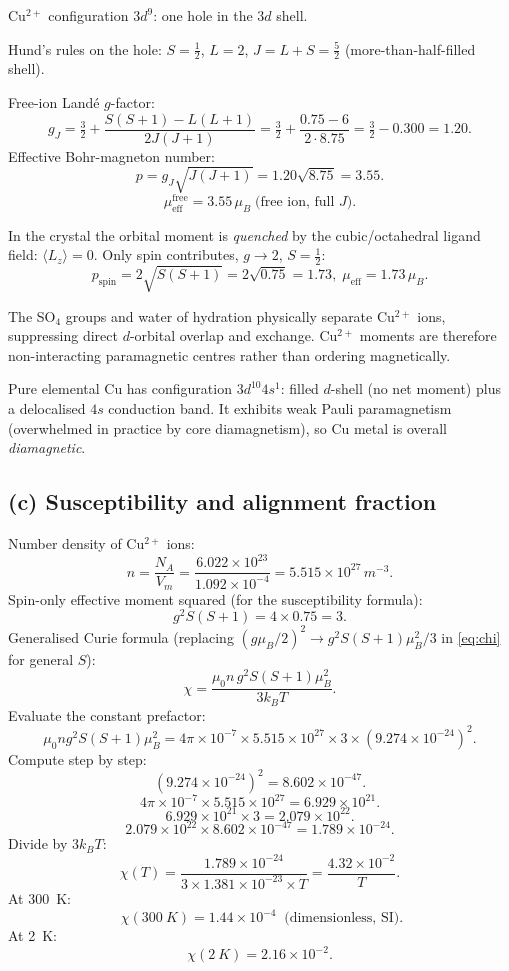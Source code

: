 \documentclass[11pt]{article}
\begin{document}
Cu$^{2+}$ configuration $3d^9$: one hole in the $3d$ shell.

Hund's rules on the hole: $S=\tfrac12$, $L=2$, $J=L+S=\tfrac52$ (more-than-half-filled shell).

Free-ion Land\'e $g$-factor:
\[
g_J = \tfrac32 + \frac{S(S+1)-L(L+1)}{2 J(J+1)} = \tfrac32 + \frac{0.75 - 6}{2\cdot 8.75} = \tfrac32 - 0.300 = 1.20.
\]
Effective Bohr-magneton number:
\[
p = g_J\sqrt{J(J+1)} = 1.20\sqrt{8.75} = 3.55.
\]
\[
\boxed{\;\mu_\text{eff}^\text{free} = 3.55\,\mu_B\;\text{(free ion, full $J$)}.\;}
\]

In the crystal the orbital moment is \emph{quenched} by the cubic/octahedral ligand field: $\langle L_z\rangle = 0$. Only spin contributes, $g\to 2$, $S=\tfrac12$:
\[
\boxed{\;p_\text{spin} = 2\sqrt{S(S+1)} = 2\sqrt{0.75} = 1.73,\;\mu_\text{eff} = 1.73\,\mu_B.\;}
\]

The SO$_4$ groups and water of hydration physically separate Cu$^{2+}$ ions, suppressing direct $d$-orbital overlap and exchange. Cu$^{2+}$ moments are therefore non-interacting paramagnetic centres rather than ordering magnetically.

Pure elemental Cu has configuration $3d^{10}4s^1$: filled $d$-shell (no net moment) plus a delocalised $4s$ conduction band. It exhibits weak Pauli paramagnetism (overwhelmed in practice by core diamagnetism), so Cu metal is overall \emph{diamagnetic}.

\subsection*{(c) Susceptibility and alignment fraction}

Number density of Cu$^{2+}$ ions:
\[
n = \frac{N_A}{V_m} = \frac{6.022\times 10^{23}}{1.092\times 10^{-4}} = 5.515\times 10^{27}\,\si{m^{-3}}.
\]
Spin-only effective moment squared (for the susceptibility formula):
\[
g^2 S(S+1) = 4\times 0.75 = 3.
\]
Generalised Curie formula (replacing $(g\mu_B/2)^2 \to g^2 S(S+1)\mu_B^2/3$ in \eqref{eq:chi} for general $S$):
\[
\chi = \frac{\mu_0 n\,g^2 S(S+1)\mu_B^2}{3 k_B T}.
\]
Evaluate the constant prefactor:
\[
\mu_0 n g^2 S(S+1)\mu_B^2 = 4\pi\times 10^{-7}\times 5.515\times 10^{27}\times 3\times (9.274\times 10^{-24})^2.
\]
Compute step by step:
\[
(9.274\times 10^{-24})^2 = 8.602\times 10^{-47}.
\]
\[
4\pi\times 10^{-7}\times 5.515\times 10^{27} = 6.929\times 10^{21}.
\]
\[
6.929\times 10^{21}\times 3 = 2.079\times 10^{22}.
\]
\[
2.079\times 10^{22}\times 8.602\times 10^{-47} = 1.789\times 10^{-24}.
\]
Divide by $3 k_B T$:
\[
\chi(T) = \frac{1.789\times 10^{-24}}{3\times 1.381\times 10^{-23}\times T} = \frac{4.32\times 10^{-2}}{T}.
\]
At \SI{300}{K}:
\[
\boxed{\;\chi(\SI{300}{K}) = 1.44\times 10^{-4}\;}\;\text{(dimensionless, SI)}.
\]
At \SI{2}{K}:
\[
\boxed{\;\chi(\SI{2}{K}) = 2.16\times 10^{-2}.\;}
\]
\end{document}
